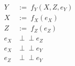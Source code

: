 \documentclass[beamer]{standalone}
\newcommand{\dsep}{\perp\!\!\!\perp}
\begin{document}
\begin{align*}
    Y & := \; f_{Y}( X,Z,e_{Y} ) \\
    X & := \; f_{X}( e_{X} ) \\
    Z & := \; f_{Z}( e_{Z} ) \\
    e_{X} & \dsep e_{Z} \\
    e_{X} & \dsep e_{Y} \\
    e_{Z} & \dsep e_{Y}
\end{align*}
\end{document}
